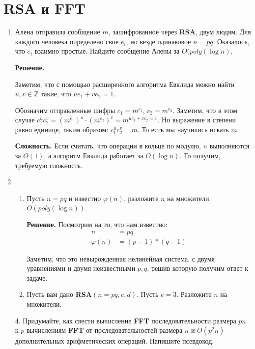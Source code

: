 \section*{RSA и FFT}
\begin{enumerate}
	\item Алена отправила сообщение $m$, зашифрованное через \textbf{RSA}, двум людям. Для каждого человека 
	определено свое $e_i$, но везде одинаковое $n = pq$. Оказалось, что $e_i$ взаимно простые. Найдите сообщение 
	Алены за $O(poly(\log n)$.
	
	\textbf{Решение.} 
	
	Заметим, что с помощью расширенного алгоритма Евклида можно найти $u, v \in \mathbb{Z}$ такие, что $ue_1 + 
	ve_2 = 1$.
	
	Обозначим отправленные шифры $c_1 = m^{e_1}$, $c_2 = m^{e_2}$. Заметим, что в этом случае $c_1^u c_2^v = 
	(m^{e_1})^u\cdot(m^{e_2})^v = m^{ue_1 + ve_2 = 1}$. Но выражение в степени равно единице, таким образом: 
	$c_1^u c_2^v = m$. То есть мы научились искать $m$.
	
 	\textbf{Сложность.} Если считать, что операции в кольце по модулю, $n$ выполняются за $O(1)$, а алгоритм 
 	Евклида работает за $O(\log n)$. То получим, требуемую сложность.
	
	\item 
	\begin{enumerate}
		\item Пусть $n = pq$ и известно $\varphi(n)$, разложите $n$ на множители. $O(poly(\log n))$.
		
		\textbf{Решение.} Посмотрим на то, что нам известно:
		\begin{align*}
			n &= pq \\
			\varphi(n) &= (p - 1) * (q - 1)
		\end{align*} 
		
		Заметим, что это невырожденная нелинейная система, с двумя уравнениями и двумя неизвестными $p, q$, решив которую получим ответ к задаче. 
			
		\item Пусть вам дано \textbf{RSA}$(n = pq, e, d)$. Пусть $e = 3$. Разложите $n$ на множители.
	\end{enumerate}
	
	\item[4.] Придумайте, как свести вычисление \textbf{FFT} последовательности размера $pn$ к $p$ вычислениям 
	\textbf{FFT} от	последовательностей размера $n$ и $O(p^2n)$ дополнительных арифметических операций. Напишите 
	псевдокод.
	

\end{enumerate}
